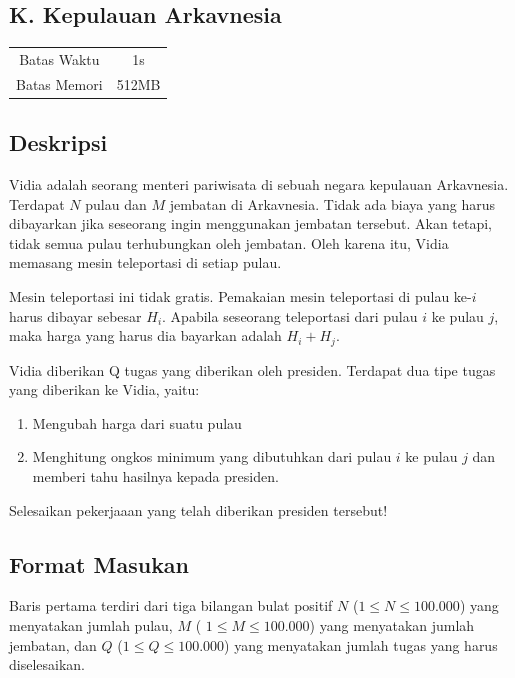 \documentclass{article}
\begin{document}
\begin{center}
    \section*{K. Kepulauan Arkavnesia} %

    \begin{tabular}{ | c c | }
        \hline
        Batas Waktu  & 1s \\    %
        Batas Memori & 512MB \\  %
        \hline
    \end{tabular}
\end{center}

\subsection*{Deskripsi}
Vidia adalah seorang menteri pariwisata di sebuah negara kepulauan Arkavnesia. Terdapat $N$ pulau dan $M$ jembatan di Arkavnesia. Tidak ada biaya yang harus dibayarkan jika seseorang ingin menggunakan jembatan tersebut. Akan tetapi, tidak semua pulau terhubungkan oleh jembatan. Oleh karena itu, Vidia memasang mesin teleportasi di setiap pulau.

Mesin teleportasi ini tidak gratis. Pemakaian mesin teleportasi di pulau ke-$i$ harus dibayar sebesar $H_i$. Apabila seseorang teleportasi dari pulau $i$ ke pulau $j$, maka harga yang harus dia bayarkan adalah $H_i + H_j$.

Vidia diberikan Q tugas yang diberikan oleh presiden. Terdapat dua tipe tugas yang diberikan ke Vidia, yaitu:

\begin{enumerate}
    \item Mengubah harga dari suatu pulau
    \item Menghitung ongkos minimum yang dibutuhkan dari pulau $i$ ke pulau $j$ dan memberi tahu hasilnya kepada presiden.
\end{enumerate}
Selesaikan pekerjaaan yang telah diberikan presiden tersebut!

\subsection*{Format Masukan}
Baris pertama terdiri dari tiga bilangan bulat positif $N$ ($1 \leq N \leq 100.000$) yang menyatakan jumlah pulau, $M$ ( $1 \leq M \leq 100.000$) yang menyatakan jumlah jembatan, dan $Q$ ($1 \leq Q \leq 100.000$) yang menyatakan jumlah tugas yang harus diselesaikan.
\end{document}
